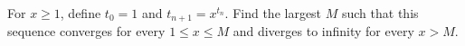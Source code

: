 For $x\ge1$, define $t_0=1$ and $t_{n+1}=x^{t_n}$. Find the largest $M$ such that this sequence converges for every $1\le x\le M$ and diverges to infinity for every $x>M$.

